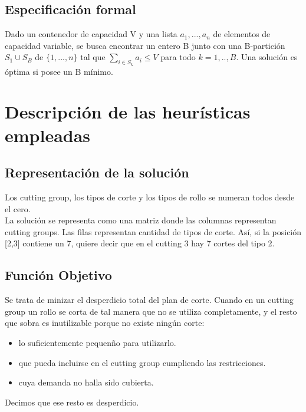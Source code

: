 \documentclass[letter,10pt]{article}
\begin{document}
\subsection{Especificación formal}

Dado un contenedor de capacidad V y una lista $a_1, ..., a_n$ de elementos de capacidad variable, se busca encontrar un entero
B junto con una B-partición $S_1 \cup S_B$ de $\{1,...,n\}$ tal que $\sum_{i \in S_k}^{} {a_i \le V}$ para todo $k = 1,..,B$.
Una solución es óptima si posee un B mínimo.

\section{Descripción de las heurísticas empleadas}

\subsection{Representación de la solución}
Los cutting group, los tipos de corte y los tipos de rollo se numeran todos desde el cero.\\
\indent La soluci\'on se representa como una matriz donde las columnas representan cutting groups. Las filas representan cantidad de tipos
de corte. As\'i, si la posici\'on [2,3] contiene un 7, quiere decir que en el cutting 3 hay 7 cortes del tipo 2.

\subsection{Función Objetivo}
Se trata de minizar el desperdicio total del plan de corte. Cuando en un cutting group un rollo se corta de tal manera que no se utiliza
completamente, y el resto que sobra es inutilizable porque no existe ning\'un corte:
\begin{itemize}
\item lo suficientemente pequen\~no para utilizarlo.
\item que pueda incluirse en el cutting group cumpliendo las restricciones.
\item cuya demanda no halla sido cubierta.
\end{itemize}
Decimos que ese resto es desperdicio.
\end{document}
